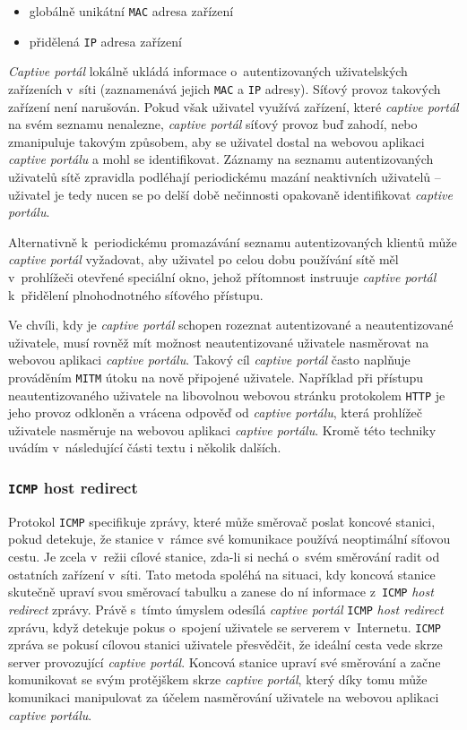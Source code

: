 \documentclass[thesis=M,czech]{FITthesis}[2012/10/20]
\begin{document}
\begin{itemize}
 \item globálně unikátní \texttt{MAC} adresa zařízení
 \item přidělená \texttt{IP} adresa zařízení
\end{itemize}

\textit{Captive portál} lokálně ukládá informace o~autentizovaných uživatelských zařízeních v~síti (zaznamenává jejich \texttt{MAC} a \texttt{IP} adresy). Síťový provoz takových zařízení není narušován. Pokud však uživatel využívá zařízení, které \textit{captive portál} na svém seznamu nenalezne, \textit{captive portál} síťový provoz buď zahodí, nebo zmanipuluje takovým způsobem, aby se uživatel dostal na webovou aplikaci \textit{captive portálu} a mohl se identifikovat. Záznamy na seznamu autentizovaných uživatelů sítě zpravidla podléhají periodickému mazání neaktivních uživatelů -- uživatel je tedy nucen se po delší době nečinnosti opakovaně identifikovat \textit{captive portálu}.

Alternativně k~periodickému promazávání seznamu autentizovaných klientů může \textit{captive portál} vyžadovat, aby uživatel po celou dobu používání sítě měl v~prohlížeči otevřené speciální okno, jehož přítomnost instruuje \textit{captive portál} k~přidělení plnohodnotného síťového přístupu.

Ve chvíli, kdy je \textit{captive portál} schopen rozeznat autentizované a neautentizované uživatele, musí rovněž mít možnost neautentizované uživatele nasměrovat na webovou aplikaci \textit{captive portálu}. Takový cíl \textit{captive portál} často naplňuje prováděním \texttt{MITM} útoku na nově připojené uživatele. Například při přístupu neautentizovaného uživatele na libovolnou webovou stránku protokolem \texttt{HTTP} je jeho provoz odkloněn a vrácena odpověď od \textit{captive portálu}, která prohlížeč uživatele nasměruje na webovou aplikaci \textit{captive portálu}. Kromě této techniky uvádím v~následující části textu i několik dalších.

\subsubsection{\texttt{ICMP} host redirect}

Protokol \texttt{ICMP} specifikuje zprávy, které může směrovač poslat koncové stanici, pokud detekuje, že stanice v~rámce své komunikace používá neoptimální síťovou cestu. Je zcela v~režii cílové stanice, zda-li si nechá o~svém směrování radit od ostatních zařízení v~síti. Tato metoda spoléhá na situaci, kdy koncová stanice skutečně upraví svou směrovací tabulku a zanese do ní informace z~\texttt{ICMP} \textit{host redirect} zprávy. Právě s~tímto úmyslem odesílá \textit{captive portál} \texttt{ICMP} \textit{host redirect} zprávu, když detekuje pokus o~spojení uživatele se serverem v~Internetu. \texttt{ICMP} zpráva se pokusí cílovou stanici uživatele přesvědčit, že ideální cesta vede skrze server provozující \textit{captive portál}. Koncová stanice upraví své směrování a začne komunikovat se svým protějškem skrze \textit{captive portál}, který díky tomu může komunikaci manipulovat za účelem nasměrování uživatele na webovou aplikaci \textit{captive portálu}.
\end{document}
